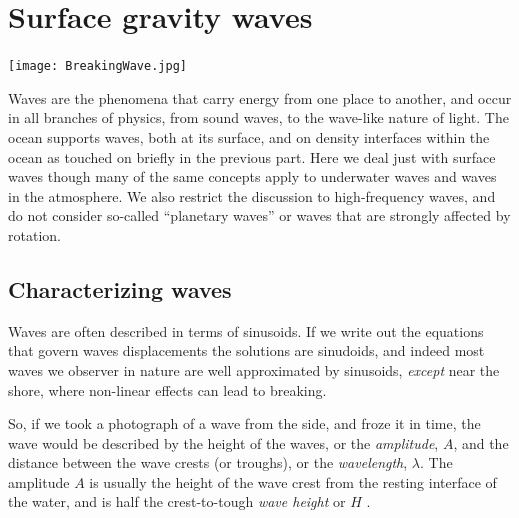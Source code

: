 
\chapter{Surface gravity waves}
\label{chap:SurfaceWaves}
\begin{center}
    \texttt{[image: BreakingWave.jpg]}
\end{center}

Waves are the phenomena that carry energy from one place to another, and occur in all branches of physics, from sound waves, to the wave-like nature of light.   The ocean  supports waves, both at its surface, and on density interfaces within the ocean as touched on briefly in the previous part.  Here we deal just with surface waves though many of the same concepts apply to underwater waves and waves in the atmosphere.  We also restrict the discussion to high-frequency waves, and do not consider so-called ``planetary waves'' or waves that are strongly affected by rotation.  

\section{Characterizing waves}

Waves are often described in terms of sinusoids.  If we write out the equations that govern waves displacements the solutions are sinudoids, and indeed most waves we observer in nature are well approximated by sinusoids, \emph{except} near the shore, where non-linear effects can lead to breaking.  

So, if we took a photograph of a wave from the side, and froze it in time, the wave would be described by the height of the waves, or the \emph{amplitude}, $A$, and the distance between the wave crests (or troughs), or the \emph{wavelength}, $\lambda$.  The amplitude $A$ is usually the height of the wave crest from the resting interface of the water, and is half the crest-to-tough \emph{wave height} or $H$ .  

